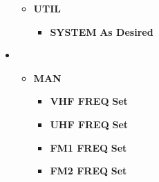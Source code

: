 \documentclass[fontHelvetica]{TechCheck}
\begin{document}
\begin{itemize}[leftmargin=0.1\linewidth,rightmargin=0.1\linewidth, itemsep=4pt]
\begin{itemize}[itemsep=4pt]
\begin{itemize}[itemsep=4pt]
			\end{itemize}
			\item \textbf{UTIL}
			\begin{itemize}[itemsep=4pt]
				\item \textbf{SYSTEM} \dotfill \textbf{As Desired}
			\end{itemize}
		\end{itemize}
		\item {}
		\begin{itemize}[itemsep=4pt]
			\item \textbf{MAN}
			\begin{itemize}[itemsep=4pt]
				\item \textbf{VHF FREQ} \dotfill \textbf{Set}
				\item \textbf{UHF FREQ} \dotfill \textbf{Set}
				\item \textbf{FM1 FREQ} \dotfill \textbf{Set}
				\item \textbf{FM2 FREQ} \dotfill \textbf{Set}
			\end{itemize}
		\end{itemize}
	\end{itemize}

\end{document}
